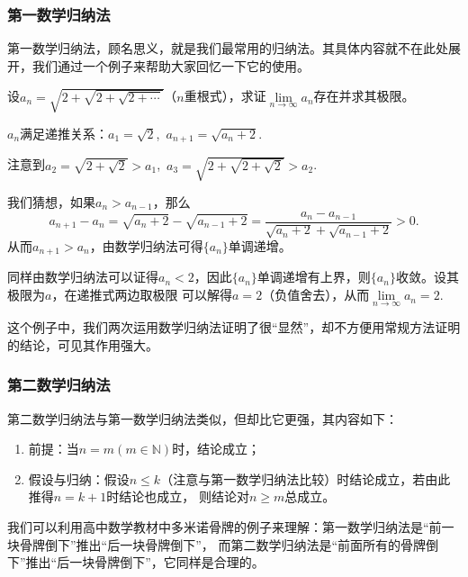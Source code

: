 \subsubsection{第一数学归纳法}
第一数学归纳法，顾名思义，就是我们最常用的归纳法。其具体内容就不在此处展开，我们通过一个例子来帮助大家回忆一下它的使用。
\begin{example}
    设$a_n=\sqrt{2+\sqrt{2+\sqrt{2+\cdots}}}$（$n$重根式），求证$\lim\limits_{n \to \infty}a_n$存在并求其极限。
\end{example}
\begin{solve}
    $a_n$满足递推关系：$a_1=\sqrt{2}$,~$a_{n+1}=\sqrt{a_n+2}$.

    注意到$a_2=\sqrt{2+\sqrt{2}}>a_1$,~$a_3=\sqrt{2+\sqrt{2+\sqrt{2}}}>a_2$.

    我们猜想，如果$a_n>a_{n-1}$，那么
    \[
        a_{n+1}-a_n=\sqrt{a_n+2}-\sqrt{a_{n-1}+2}=
        \frac{a_n-a_{n-1}}{\sqrt{a_n+2}+\sqrt{a_{n-1}+2}}>0
        .\]
    从而$a_{n+1}>a_n$，由数学归纳法可得$\{ a_n\}$单调递增。


    同样由数学归纳法可以证得$a_n<2$，因此$\{ a_n\}$单调递增有上界，则$\{ a_n\}$收敛。设其极限为$a$，在递推式两边取极限
    可以解得$a=2$（负值舍去），从而$\lim\limits_{n \to \infty}a_n=2$.
\end{solve}
这个例子中，我们两次运用数学归纳法证明了很“显然”，却不方便用常规方法证明的结论，可见其作用强大。
\subsubsection{第二数学归纳法}
第二数学归纳法与第一数学归纳法类似，但却比它更强，其内容如下：

\begin{enumerate}
    \item 前提：当$n=m(m \in \mathbb{N})$时，结论成立；
    \item 假设与归纳：假设$n\leqslant k$（注意与第一数学归纳法比较）时结论成立，若由此推得$n=k+1$时结论也成立，
          则结论对$n \geqslant m$总成立。

\end{enumerate}

我们可以利用高中数学教材中多米诺骨牌的例子来理解：第一数学归纳法是“前一块骨牌倒下”推出“后一块骨牌倒下”，
而第二数学归纳法是“前面所有的骨牌倒下”推出“后一块骨牌倒下”，它同样是合理的。


